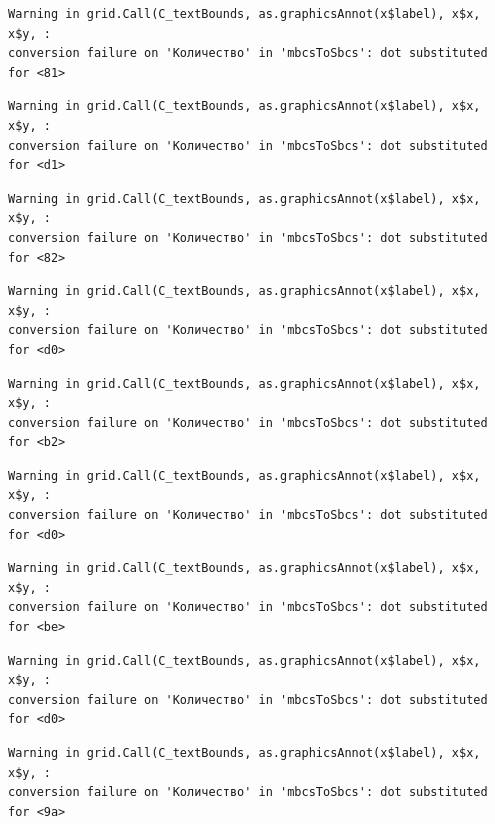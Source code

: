 \documentclass[
  letterpaper,
  DIV=11,
  numbers=noendperiod]{scrreprt}
\theoremstyle{definition}
\theoremstyle{remark}
\begin{document}
\begin{verbatim}
Warning in grid.Call(C_textBounds, as.graphicsAnnot(x$label), x$x, x$y, :
conversion failure on 'Количество' in 'mbcsToSbcs': dot substituted for <81>
\end{verbatim}

\begin{verbatim}
Warning in grid.Call(C_textBounds, as.graphicsAnnot(x$label), x$x, x$y, :
conversion failure on 'Количество' in 'mbcsToSbcs': dot substituted for <d1>
\end{verbatim}

\begin{verbatim}
Warning in grid.Call(C_textBounds, as.graphicsAnnot(x$label), x$x, x$y, :
conversion failure on 'Количество' in 'mbcsToSbcs': dot substituted for <82>
\end{verbatim}

\begin{verbatim}
Warning in grid.Call(C_textBounds, as.graphicsAnnot(x$label), x$x, x$y, :
conversion failure on 'Количество' in 'mbcsToSbcs': dot substituted for <d0>
\end{verbatim}

\begin{verbatim}
Warning in grid.Call(C_textBounds, as.graphicsAnnot(x$label), x$x, x$y, :
conversion failure on 'Количество' in 'mbcsToSbcs': dot substituted for <b2>
\end{verbatim}

\begin{verbatim}
Warning in grid.Call(C_textBounds, as.graphicsAnnot(x$label), x$x, x$y, :
conversion failure on 'Количество' in 'mbcsToSbcs': dot substituted for <d0>
\end{verbatim}

\begin{verbatim}
Warning in grid.Call(C_textBounds, as.graphicsAnnot(x$label), x$x, x$y, :
conversion failure on 'Количество' in 'mbcsToSbcs': dot substituted for <be>
\end{verbatim}

\begin{verbatim}
Warning in grid.Call(C_textBounds, as.graphicsAnnot(x$label), x$x, x$y, :
conversion failure on 'Количество' in 'mbcsToSbcs': dot substituted for <d0>
\end{verbatim}

\begin{verbatim}
Warning in grid.Call(C_textBounds, as.graphicsAnnot(x$label), x$x, x$y, :
conversion failure on 'Количество' in 'mbcsToSbcs': dot substituted for <9a>
\end{verbatim}
\end{document}
